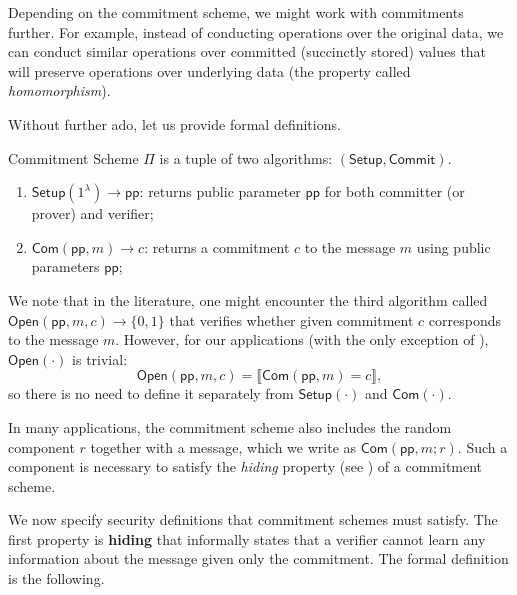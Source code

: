 \documentclass[../../book]{subfiles}
\begin{document}
Depending on the commitment scheme, we might work with commitments further.
For example, instead of conducting operations over the original data, we can conduct similar operations over committed (succinctly stored) values that will preserve operations over underlying data (the property called \emph{homomorphism}).

Without further ado, let us provide formal definitions.

\begin{definition}
    Commitment Scheme $\Pi$ is a tuple of two algorithms: $(\mathsf{Setup}, \mathsf{Commit})$.

    \begin{enumerate}
        \item $\mathsf{Setup}(1^{\lambda}) \to \mathsf{pp}$: returns public parameter $\mathsf{pp}$ for both committer (or prover) and verifier;
        \item $\mathsf{Com}(\mathsf{pp}, m) \to c$: returns a commitment $c$ to the message $m$ using public parameters $\mathsf{pp}$;
    \end{enumerate}
\end{definition}

We note that in the literature, one might encounter the third algorithm called $\mathsf{Open}(\mathsf{pp}, m, c) \to \{0,1\}$ that verifies whether given commitment $c$ corresponds to the message $m$.
However, for our applications (with the only exception of ), $\mathsf{Open}(\cdot)$ is trivial:
\begin{equation*}
    \mathsf{Open}(\mathsf{pp}, m, c) = \llbracket \mathsf{Com}(\mathsf{pp}, m) = c \rrbracket,
\end{equation*}
so there is no need to define it separately from $\mathsf{Setup}(\cdot)$ and $\mathsf{Com}(\cdot)$.

\begin{remark}
    In many applications, the commitment scheme also includes the random component $r$ together with a message, which we write as $\mathsf{Com}(\mathsf{pp}, m; r)$.
    Such a component is necessary to satisfy the \emph{hiding} property (see ) of a commitment scheme.
\end{remark}

We now specify security definitions that commitment schemes must satisfy.
The first property is \textbf{hiding} that informally states that a verifier cannot learn any information about the message given only the commitment.
The formal definition is the following.
\end{document}
